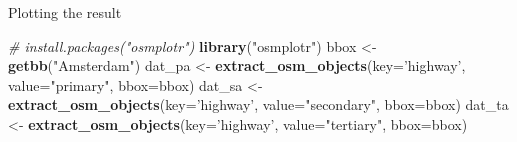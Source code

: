 \documentclass[ignorenonframetext,]{beamer}
\newenvironment{Shaded}{\begin{snugshade}}{\end{snugshade}}
\newcommand{\CommentTok}[1]{\textcolor[rgb]{0.56,0.35,0.01}{\textit{#1}}}
\newcommand{\DataTypeTok}[1]{\textcolor[rgb]{0.13,0.29,0.53}{#1}}
\newcommand{\KeywordTok}[1]{\textcolor[rgb]{0.13,0.29,0.53}{\textbf{#1}}}
\newcommand{\NormalTok}[1]{#1}
\newcommand{\OperatorTok}[1]{\textcolor[rgb]{0.81,0.36,0.00}{\textbf{#1}}}
\newcommand{\StringTok}[1]{\textcolor[rgb]{0.31,0.60,0.02}{#1}}
\begin{document}
\begin{frame}[fragile]{Plotting the result}
\protect\hypertarget{plotting-the-result}{}

\begin{Shaded}
\begin{Highlighting}[]
\CommentTok{# install.packages("osmplotr")}
\KeywordTok{library}\NormalTok{(}\StringTok{"osmplotr"}\NormalTok{)}
\NormalTok{bbox <-}\StringTok{ }\KeywordTok{getbb}\NormalTok{(}\StringTok{"Amsterdam"}\NormalTok{)}
\NormalTok{dat_pa <-}\StringTok{ }\KeywordTok{extract_osm_objects}\NormalTok{(}\DataTypeTok{key=}\StringTok{'highway'}\NormalTok{, }
                              \DataTypeTok{value=}\StringTok{"primary"}\NormalTok{,}
                              \DataTypeTok{bbox=}\NormalTok{bbox)}
\NormalTok{dat_sa <-}\StringTok{ }\KeywordTok{extract_osm_objects}\NormalTok{(}\DataTypeTok{key=}\StringTok{'highway'}\NormalTok{, }
                              \DataTypeTok{value=}\StringTok{"secondary"}\NormalTok{,}
                              \DataTypeTok{bbox=}\NormalTok{bbox)}
\NormalTok{dat_ta <-}\StringTok{ }\KeywordTok{extract_osm_objects}\NormalTok{(}\DataTypeTok{key=}\StringTok{'highway'}\NormalTok{, }
                              \DataTypeTok{value=}\StringTok{"tertiary"}\NormalTok{,}
                              \DataTypeTok{bbox=}\NormalTok{bbox)}
\end{Highlighting}
\end{Shaded}

\begin{Shaded}
\end{Shaded}

\end{frame}
\end{document}
